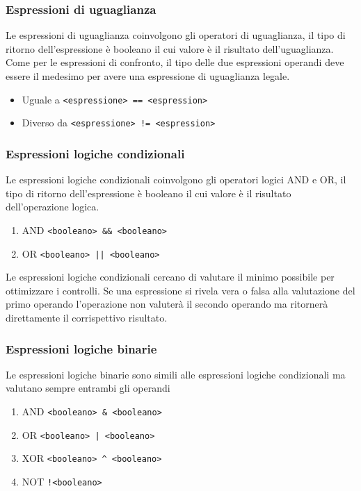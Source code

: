\subsubsection{Espressioni di uguaglianza}
Le espressioni di uguaglianza coinvolgono gli operatori di uguaglianza, 
il tipo di ritorno dell'espressione è booleano il cui valore è il risultato dell'uguaglianza. 
\\
Come per le espressioni di confronto, il tipo delle due espressioni operandi deve essere il medesimo
per avere una espressione di uguaglianza legale.
\begin{itemize}
    \item Uguale a \verb|<espressione> == <espression>|
    \item Diverso da \verb|<espressione> != <espression>|
\end{itemize}

\subsubsection{Espressioni logiche condizionali}
Le espressioni logiche condizionali coinvolgono gli operatori logici AND e OR,
il tipo di ritorno dell'espressione è booleano il cui valore è il risultato dell'operazione logica.
\begin{enumerate}
    \item AND \verb|<booleano> && <booleano>|
    \item OR \verb=<booleano> || <booleano>=
\end{enumerate}

Le espressioni logiche condizionali cercano di valutare il minimo possibile per ottimizzare i controlli.
Se una espressione si rivela vera o falsa alla valutazione del primo operando l'operazione non 
valuterà il secondo operando ma ritornerà direttamente il corrispettivo risultato.

\subsubsection{Espressioni logiche binarie}
Le espressioni logiche binarie sono simili alle espressioni logiche condizionali ma valutano sempre
entrambi gli operandi
\begin{enumerate}
    \item AND \verb|<booleano> & <booleano>|
    \item OR \verb=<booleano> | <booleano>=
    \item XOR \verb|<booleano> ^ <booleano>|
    \item NOT \verb|!<booleano>|
\end{enumerate}

